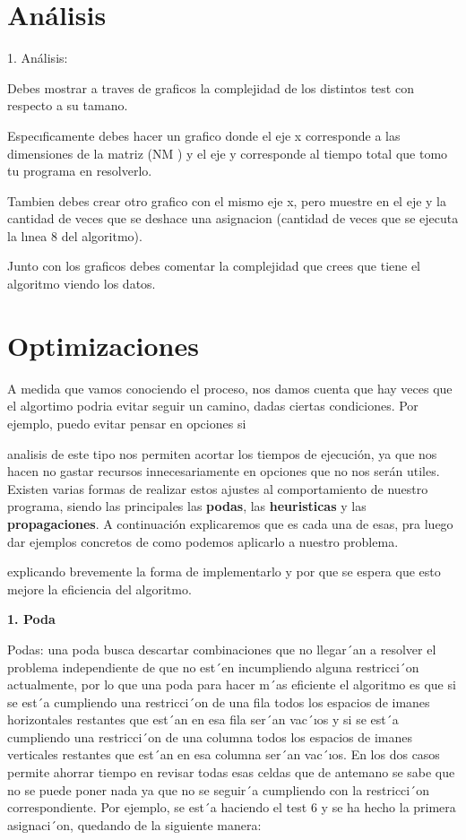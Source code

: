 \documentclass[12pt]{article}
\begin{document}
\section*{Análisis}


1. Análisis: 

Debes mostrar a traves de graficos la complejidad de los distintos test con respecto a su tamano. 

Especıficamente debes hacer un grafico donde el eje x corresponde a las dimensiones de la matriz (NM ) y el eje y corresponde al tiempo total que tomo tu programa en resolverlo. 

Tambien debes crear otro grafico con el mismo eje x, pero muestre en el eje y la cantidad de veces que se deshace una asignacion (cantidad de veces que se ejecuta la lınea 8 del algoritmo).


Junto con los graficos debes comentar la complejidad que crees que tiene el algoritmo viendo los datos.




\newpage
\section*{Optimizaciones}

A medida que vamos conociendo el proceso, nos damos cuenta que hay veces que el algortimo podria evitar seguir un camino, dadas ciertas condiciones. Por ejemplo, puedo evitar pensar en opciones si

analisis de este tipo nos permiten acortar los tiempos de ejecución, ya que nos hacen no gastar recursos innecesariamente en opciones que no nos serán utiles. Existen varias formas de realizar estos ajustes al comportamiento de nuestro programa, siendo las principales las \textbf{podas}, las \textbf{heuristicas} y las \textbf{propagaciones}.
A continuación explicaremos que es cada una de esas, pra luego dar ejemplos concretos de como podemos aplicarlo a nuestro problema.


explicando brevemente la forma de implementarlo y por que se espera que esto mejore la eficiencia del algoritmo.





\textbf{1. Poda}

Podas: una poda busca descartar combinaciones que no llegar´an a resolver el problema independiente
de que no est´en incumpliendo alguna restricci´on actualmente, por lo que una poda para hacer m´as eficiente
el algoritmo es que si se est´a cumpliendo una restricci´on de una fila todos los espacios de imanes horizontales
restantes que est´an en esa fila ser´an vac´ıos y si se est´a cumpliendo una restricci´on de una columna todos
los espacios de imanes verticales restantes que est´an en esa columna ser´an vac´ıos. En los dos casos permite
ahorrar tiempo en revisar todas esas celdas que de antemano se sabe que no se puede poner nada ya que
no se seguir´a cumpliendo con la restricci´on correspondiente. Por ejemplo, se est´a haciendo el test 6 y se ha
hecho la primera asignaci´on, quedando de la siguiente manera:
\end{document}
